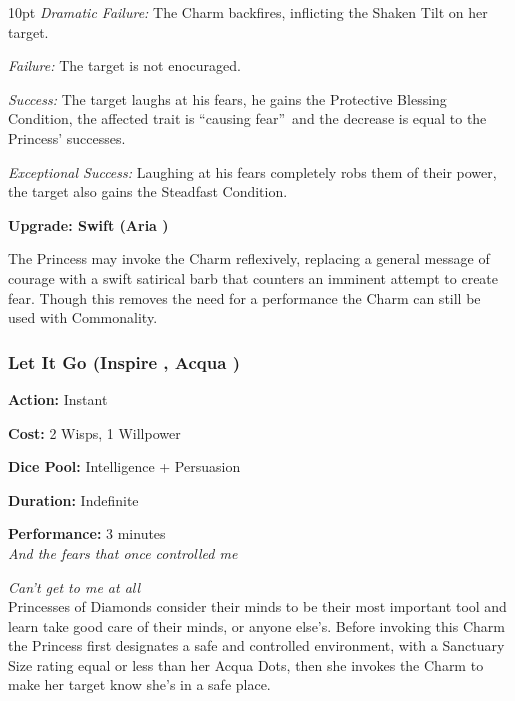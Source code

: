 \begin{myindentpar}{10pt}    \emph{Dramatic Failure:} The Charm backfires, inflicting the Shaken Tilt on her target. 

    \emph{Failure:} The target is not enocuraged. 

    \emph{Success:} The target laughs at his fears, he gains the Protective Blessing Condition, the affected trait is \textquotedblleft causing fear\textquotedblright\, and the decrease is equal to the Princess' successes.

    \emph{Exceptional Success:} Laughing at his fears completely robs them of their power, the target also gains the Steadfast Condition. 

\textbf{Upgrade: Swift (Aria \textbullet\textbullet)}

The Princess may invoke the Charm reflexively, replacing a general message of courage with a swift satirical barb that counters an imminent attempt to create fear. Though this removes the need for a performance the Charm can still be used with Commonality. \end{myindentpar}

\subsubsection*{Let It Go (Inspire \textbullet\textbullet, Acqua \textbullet\textbullet\textbullet)}

\noindent \textbf{Action:} Instant

\noindent \textbf{Cost:} 2 Wisps, 1 Willpower

\noindent \textbf{Dice Pool:} Intelligence + Persuasion

\noindent \textbf{Duration:} Indefinite

\noindent \textbf{Performance:} 3 minutes \\	

\textit{And the fears that once controlled me}

\textit{Can't get to me at all} \\

\noindent Princesses of Diamonds consider their minds to be their most important tool and learn take good care of their minds, or anyone else's. Before invoking this Charm the Princess first designates a safe and controlled environment, with a Sanctuary Size rating equal or less than her Acqua Dots, then she invokes the Charm to make her target know she's in a safe place. 

